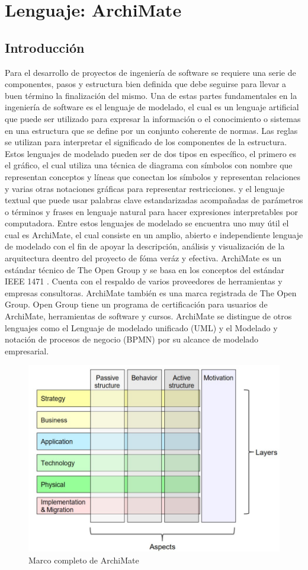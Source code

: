 \chapter{Lenguaje: ArchiMate}
\section{Introducción}
Para el desarrollo de proyectos de ingeniería de software se requiere una serie de componentes, pasos y estructura bien definida que debe seguirse para llevar a buen término la finalización del mismo. Una de estas partes fundamentales en la ingeniería de software es el lenguaje de modelado, el cual es un lenguaje artificial que puede ser utilizado para expresar la información o el conocimiento o sistemas en una estructura que se define por un conjunto coherente de normas. Las reglas se utilizan para interpretar el significado de los componentes de la estructura. Estos lenguajes de modelado pueden ser de dos tipos en específico, el primero es el gráfico, el cual utiliza una técnica de diagrama con símbolos con nombre que representan conceptos y líneas que conectan los símbolos y representan relaciones y varias otras notaciones gráficas para representar restricciones. y el lenguaje textual que puede usar palabras clave estandarizadas acompañadas de parámetros o términos y frases en lenguaje natural para hacer expresiones interpretables por computadora. Entre estos lenguajes de modelado se encuentra uno muy útil el cual es ArchiMate, el cual consiste en un amplio, abierto e independiente lenguaje de modelado con el fin de apoyar la descripción, análisis y visualización de la arquitectura deentro del proyecto de fóma veráz y efectiva. ArchiMate es un estándar técnico de The Open Group y se basa en los conceptos del estándar IEEE 1471 . Cuenta con el respaldo de varios proveedores de herramientas y empresas consultoras. ArchiMate también es una marca registrada de The Open Group. Open Group tiene un programa de certificación para usuarios de ArchiMate, herramientas de software y cursos. ArchiMate se distingue de otros lenguajes como el Lenguaje de modelado unificado (UML) y el Modelado y notación de procesos de negocio (BPMN) por su alcance de modelado empresarial.

\begin{figure}[h!]
	\centering
	\includegraphics[width=0.7\linewidth]{imgs/coreFramwork}
	\caption{Marco completo de ArchiMate}
\end{figure}

